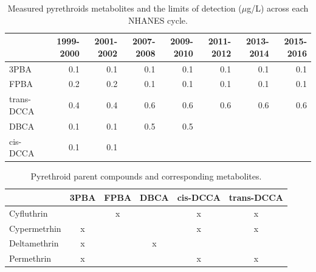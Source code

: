 \documentclass[toxics,article,submit,pdftex,moreauthors]{Definitions/mdpi}
\begin{document}
\begin{table}[H]
\begin{adjustwidth}{-4cm}{}
  \caption{Measured pyrethroids metabolites and the limits of detection ($\mu$g/L) across each NHANES cycle.}
\label{tab:taba1}
\begin{tabular}{lrrrrrrr}
\toprule
  & 1999-2000 & 2001-2002 & 2007-2008 & 2009-2010 & 2011-2012 & 2013-2014 & 2015-2016\\
\midrule
3PBA & 0.1 & 0.1 & 0.1 & 0.1 & 0.1 & 0.1 & 0.1\\
FPBA & 0.2 & 0.2 & 0.1 & 0.1 & 0.1 & 0.1 & 0.1\\
trans-DCCA & 0.4 & 0.4 & 0.6 & 0.6 & 0.6 & 0.6 & 0.6\\
DBCA & 0.1 & 0.1 & 0.5 & 0.5 &  &  & \\
cis-DCCA & 0.1 & 0.1 &  &  &  &  & \\
\bottomrule
\end{tabular}
\end{adjustwidth}
\end{table}


\begin{table}[H]
\begin{adjustwidth}{-4cm}{}
\caption{\label{tab:taba2}Pyrethroid parent compounds and corresponding metabolites.}
\begin{tabular}[t]{lccccc}
\toprule
  & 3PBA & FPBA & DBCA & cis-DCCA & trans-DCCA\\
\midrule
Cyfluthrin &  & x &  & x & x\\
Cypermetrhin & x &  &  & x & x\\
Deltamethrin & x &  & x &  & \\
Permethrin & x &  &  & x & x\\
\bottomrule
\end{tabular}
\end{adjustwidth}
\end{table}
\end{document}

